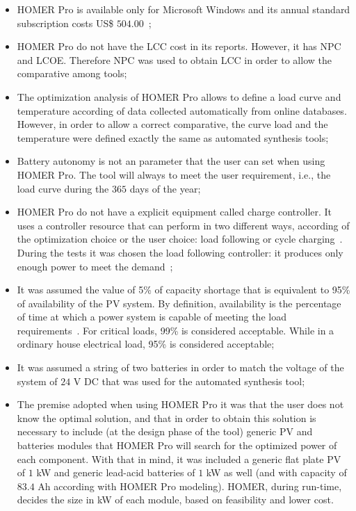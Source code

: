 \documentclass[review]{elsarticle}
\begin{document}
\begin{itemize}
	\item HOMER Pro is available only for Microsoft Windows and its annual standard subscription costs US\$ $504.00$~\cite{HOMER};
	\item HOMER Pro do not have the LCC cost in its reports. However, it has NPC and LCOE. Therefore NPC was used to obtain LCC in order to allow the comparative among tools;
	\item The optimization analysis of HOMER Pro allows to define a load curve and temperature according of data collected automatically from online databases. However, in order to allow a correct comparative, the curve load and the temperature were defined exactly the same as automated synthesis tools;
	\item Battery autonomy is not an parameter that the user can set when using HOMER Pro. The tool will always to meet the user requirement, i.e., the load curve during the $365$ days of the year;
	\item HOMER Pro do not have a explicit equipment called charge controller. It uses a controller resource that can perform in two different ways, according of the optimization choice or the user choice: load following or cycle charging~\cite{HOMER}. During the tests it was chosen the load following controller: it produces only enough power to meet the demand~\cite{HOMER};
	\item It was assumed the value of 5\% of capacity shortage that is equivalent to 95\% of availability of the PV system. By definition, availability is the percentage of time at which a power system is capable of meeting the load requirements~\citep{Khatib2014}. For critical loads, 99\% is considered acceptable. While in a ordinary house electrical load, 95\% is considered acceptable;
	\item It was assumed a string of two batteries in order to match the voltage of the system of $24$ V DC that was used for the automated synthesis tool;
	\item The premise adopted when using HOMER Pro it was that the user does not know the optimal solution, and that in order to obtain this solution is necessary to include (at the design phase of the tool) generic PV and batteries modules that HOMER Pro will search for the optimized power of each component. With that in mind, it was included a generic flat plate PV of $1$ kW and generic lead-acid batteries of $1$ kW as well (and with capacity of $83.4$ Ah according with HOMER Pro modeling). HOMER, during run-time, decides the size in kW of each module, based on feasibility and lower cost.
\end{itemize}
\end{document}
